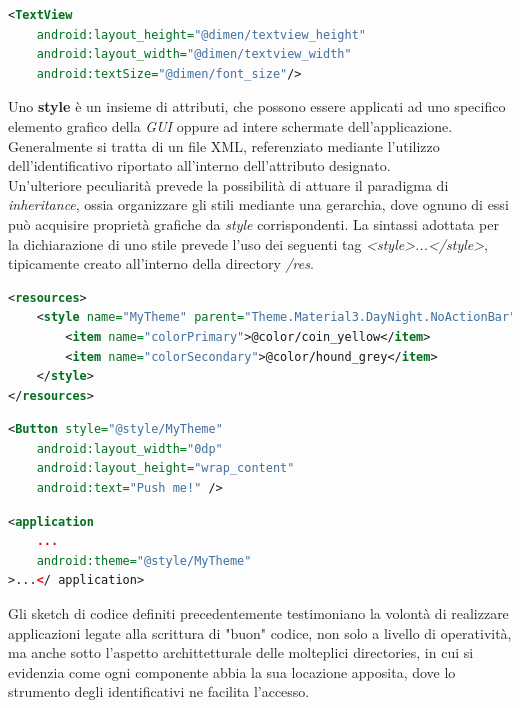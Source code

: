 \documentclass{article}
\begin{document}
\begin{center}
    \begin{lstlisting}[language=XML, title=Assegnamento delle dimen agli attributi del XMl layout]
<TextView
    android:layout_height="@dimen/textview_height"
    android:layout_width="@dimen/textview_width"
    android:textSize="@dimen/font_size"/>
    \end{lstlisting}  
\end{center}
Uno \textbf{style} è un insieme di attributi, che possono essere applicati ad uno specifico elemento grafico della \textit{GUI} oppure ad intere schermate dell'applicazione. Generalmente si tratta di un file XML, referenziato mediante l'utilizzo dell'identificativo riportato all'interno dell'attributo designato.\vspace*{7pt}\\
Un'ulteriore peculiarità prevede la possibilità di attuare il paradigma di \textit{inheritance}, ossia organizzare gli stili mediante una gerarchia, dove ognuno di essi può acquisire proprietà grafiche da \textit{style} corrispondenti. La sintassi adottata per la dichiarazione di uno stile prevede l'uso dei seguenti tag \textit{<style>...</style>}, tipicamente creato all'interno della directory \textit{/res}.
\begin{lstlisting}[language=XML, title=Dichiarazione di uno style]
<resources>
    <style name="MyTheme" parent="Theme.Material3.DayNight.NoActionBar">
        <item name="colorPrimary">@color/coin_yellow</item>
        <item name="colorSecondary">@color/hound_grey</item>
    </style>
</resources>
\end{lstlisting}  
\begin{lstlisting}[language=XML, title=Assegnamento dello stile ad un solo elemento grafico]
<Button style="@style/MyTheme"
    android:layout_width="0dp"
    android:layout_height="wrap_content"
    android:text="Push me!" />    
\end{lstlisting}  
\begin{lstlisting}[language=XML, title=Assegnamento dello stile all'intera applicazione]
<application
    ...
    android:theme="@style/MyTheme"
>...</ application>    
\end{lstlisting}  
Gli sketch di codice definiti precedentemente testimoniano la volontà di realizzare applicazioni legate alla scrittura di "buon" codice, non solo a livello di operatività, ma anche sotto l'aspetto archittetturale delle molteplici directories, in cui si evidenzia come ogni componente abbia la sua locazione apposita, dove lo strumento degli identificativi ne facilita l'accesso.
\end{document}
